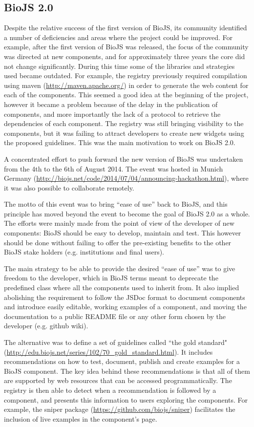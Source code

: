 \subsection{BioJS 2.0}
Despite the relative success of the first version of BioJS, its community identified a number of deficiencies and areas where the project could be improved. For example, after the first version of BioJS was released, the focus of the community was directed at new components, and for approximately three years the core did not change significantly. During this time some of the libraries and strategies used became outdated. For example, the registry previously required compilation using maven (\url{http://maven.apache.org/}) in order to generate the web content for each of the components. This seemed a good idea at the beginning of the project, however it became a problem because of the delay in the publication of components, and more importantly the lack of a protocol to retrieve the dependencies of each component. The registry was still bringing visibility to the components, but it was failing to attract developers to create new widgets using the proposed guidelines. This was the main motivation to work on BioJS 2.0.

A concentrated effort to push forward the new version of BioJS was undertaken from the 4th to the 6th of August 2014. The event was hosted in Munich Germany (\url{http://biojs.net/code/2014/07/04/announcing-hackathon.html}), where it was also possible to collaborate remotely. 

The motto of this event was to bring ``ease of use'' back to BioJS, and this principle has moved beyond the event to become the goal of BioJS 2.0 as a whole.  The efforts were mainly made from the point of view of the developer of new components: BioJS should be easy to develop, maintain and test. This however should be done without failing to offer the pre-existing benefits to the other BioJS stake holders (e.g. institutions and final users).

The main strategy to be able to provide the desired ``ease of use'' was to give freedom to the developer, which in BioJS terms meant to deprecate the predefined class where all the components used to inherit from. It also implied abolishing the requirement to follow the JSDoc format to document components and introduce easily editable, working examples of a component, and moving the documentation to a public README file or any other form chosen by the developer (e.g. github wiki).

The alternative was to define a set of guidelines called ``the gold standard" (\url{http://edu.biojs.net/series/102/70_gold_standard.html}). It includes recommendations on how to test, document, publish and create examples for a BioJS component. The key idea behind these recommendations is that all of them are supported by web resources that can be accessed programmatically. The registry is then able to detect when a recommendation is followed by a component, and presents this information to users exploring the components. For example, the sniper package (\url{https://github.com/biojs/sniper}) facilitates the inclusion of live examples in the component's page.

